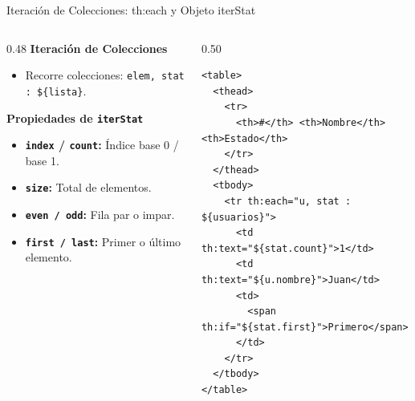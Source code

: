 \documentclass[aspectratio=169]{beamer}
\begin{document}
\begin{frame}[fragile]{Iteraci\'on de Colecciones: th:each y Objeto iterStat}
\begin{columns}[T]
\begin{column}{0.48\textwidth}
  \textbf{Iteraci\'on de Colecciones}
  \begin{itemize}
    \item Recorre colecciones: \texttt{elem, stat : \$\{lista\}}.
  \end{itemize}
  \vspace{2pt}
  \textbf{Propiedades de \texttt{iterStat}}
  \begin{itemize}
    \item \textbf{\texttt{index} / \texttt{count}:} \'Indice base 0 / base 1.
    \item \textbf{\texttt{size}:} Total de elementos.
    \item \textbf{\texttt{even / odd}:} Fila par o impar.
    \item \textbf{\texttt{first / last}:} Primer o \'ultimo elemento.
  \end{itemize}
\end{column}
\begin{column}{0.50\textwidth}
\begin{lstlisting}[style=ThymeleafStyle]
<table>
  <thead>
    <tr>
      <th>#</th> <th>Nombre</th> <th>Estado</th>
    </tr>
  </thead>
  <tbody>
    <tr th:each="u, stat : ${usuarios}">
      <td th:text="${stat.count}">1</td>
      <td th:text="${u.nombre}">Juan</td>
      <td>
        <span th:if="${stat.first}">Primero</span>
      </td>
    </tr>
  </tbody>
</table>
\end{lstlisting}
\end{column}
\end{columns}
\end{frame}
\end{document}
